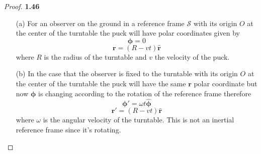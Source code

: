 \documentclass[11pt]{article}
\newcommand{\hatr}{\bm{\hat{r}}}
\newcommand{\hatphi}{\bm{\hat{\phi}}}
\begin{document}
    \begin{proof}{\textbf{1.46}}
        \begin{itemize}
            \item[(a)] For an observer on the ground in a reference frame
            $\mathscr{S}$ with its origin $O$ at the center of the turntable
            the puck will have polar coordinates given by
            $$\bm{\phi} = 0$$
            $$\bm{r} = (R - vt) \hatr $$
            where $R$ is the radius of the turntable and $v$ the velocity of
            the puck.
            \item[(b)] In the case that the observer is fixed to the turntable
            with its origin $O$ at the center of the turntable the puck will
            have the same $\bm{r}$ polar coordinate but now $\bm{\phi}$ is
            changing according to the rotation of the reference frame therefore 
            $$\bm{\phi'} = \omega t \hatphi $$
            $$\bm{r'} = (R - vt) \hatr $$
            where $\omega$ is the angular velocity of the turntable.
            This is not an inertial reference frame since it's rotating.
        \end{itemize}
    \end{proof}
\cleardoublepage
\end{document}
